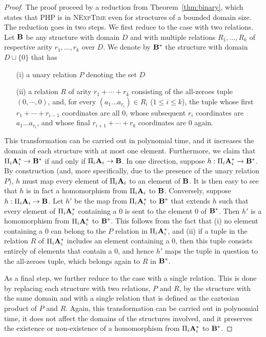 \documentclass{article}
\newcommand{\aest}{{\bf A}}
\newcommand{\best}{{\bf B}}
\newcommand{\nexptime}{\textsc{NExpTime}\xspace}
\begin{document}
\begin{proof}
The proof proceed by a reduction from Theorem~\ref{thm:binary},
 which states that PHP is in \nexptime even
  for structures of a bounded domain size.  The reduction goes in two steps.
  We first reduce to the case with two
  relations. Let $\best$ be any structure  with domain $D$ and with multiple relations
  $R_1,\dots,R_k$ of respective arity $r_1, \ldots, r_k$ over $D$.
  We denote by $\best^*$ the structure with domain $D\cup\{0\}$
  that has 
\begin{enumerate}
\item[(i)] a unary relation $P$ denoting the set $D$
\item[(ii)] a relation $R$ of arity
   $r_1+ \cdots + r_k$ consisting of 
   the all-zeroes tuple $(0, \cdots, 0)$, and, 
   for every $(a_1\ldots a_{r_i})\in R_i$ ($1\leq i\leq
  k$), the tuple whose first $r_1 + \cdots + r_{i-1}$ coordinates
   are all $0$, whose subsequent $r_i$ coordinates are $a_1\ldots
   a_{r_i}$,  and whose final $r_{i+1}+\cdots+r_k$ coordinates are $0$
   again.
\end{enumerate}
This transformation can be carried out in
  polynomial time, and it increases the domain of each structure with
  at most one element. Furthermore, we claim that
  $\Pi_i\aest_i^*\to \best^*$ if and
  only if $\Pi_i\aest_i\to \best$. 
In one direction, suppose $h:\Pi_i\aest_i^*\to\best^*$. By
  construction (and, more specifically, due to the presence of the
  unary relation $P$), $h$ must map every element of $\Pi_i\aest_i$ to
  an element of $\best$. It is then easy to see that $h$ is in fact a
  homomorphism from $\Pi_i\aest_i$ to $\best$. 
  Conversely, suppose $h:\Pi_i\aest_i\to
  \best$. Let $h'$ be the map from $\Pi_i\aest_i^*$
  to $\best^*$ that extends $h$ such that every element of $\Pi_i\aest_i^*$
  containing a 0 is sent to the element 0 of $\best^*$. 
  Then $h'$ is a homomorphism from 
  $\Pi_i\aest_i^*$ to $\best^*$. This follows from 
  the fact that (i) no element containing a 0 can 
  belong to the $P$ relation in $\Pi_i\aest_i^*$, 
  and (ii) if a tuple in the relation $R$ of $\Pi_i\aest_i^*$
  includes an element containing a $0$, then this
  tuple consists entirely of elements that contain a 0, 
  and hence $h'$ maps the tuple in question to 
  the all-zeroes tuple, which belongs again to $R$ in $\best^*$.

  As a final step, we further reduce to the case with a single relation.
  This is done by replacing each structure with two relations, $P$ and
  $R$, by the structure with the same domain and with a single
  relation that is defined as the cartesian product of $P$ and $R$. 
  Again, this transformation can be carried out in polynomial time,
  it does not affect the domains of the structures involved, and
  it preserves the existence or non-existence of a homomorphism
  from $\Pi_i\aest^*_i$ to $\best^*$.  
\end{proof}
\end{document}
